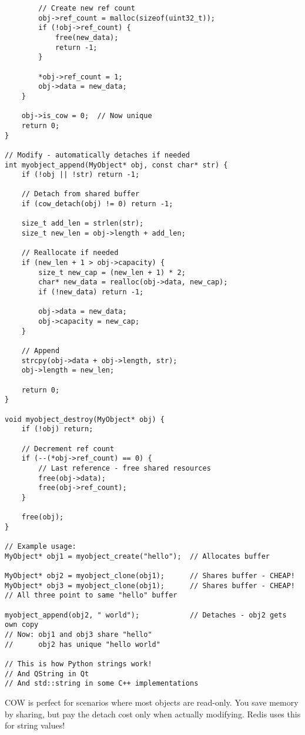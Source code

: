 \begin{lstlisting}
        // Create new ref count
        obj->ref_count = malloc(sizeof(uint32_t));
        if (!obj->ref_count) {
            free(new_data);
            return -1;
        }

        *obj->ref_count = 1;
        obj->data = new_data;
    }

    obj->is_cow = 0;  // Now unique
    return 0;
}

// Modify - automatically detaches if needed
int myobject_append(MyObject* obj, const char* str) {
    if (!obj || !str) return -1;

    // Detach from shared buffer
    if (cow_detach(obj) != 0) return -1;

    size_t add_len = strlen(str);
    size_t new_len = obj->length + add_len;

    // Reallocate if needed
    if (new_len + 1 > obj->capacity) {
        size_t new_cap = (new_len + 1) * 2;
        char* new_data = realloc(obj->data, new_cap);
        if (!new_data) return -1;

        obj->data = new_data;
        obj->capacity = new_cap;
    }

    // Append
    strcpy(obj->data + obj->length, str);
    obj->length = new_len;

    return 0;
}

void myobject_destroy(MyObject* obj) {
    if (!obj) return;

    // Decrement ref count
    if (--(*obj->ref_count) == 0) {
        // Last reference - free shared resources
        free(obj->data);
        free(obj->ref_count);
    }

    free(obj);
}

// Example usage:
MyObject* obj1 = myobject_create("hello");  // Allocates buffer

MyObject* obj2 = myobject_clone(obj1);      // Shares buffer - CHEAP!
MyObject* obj3 = myobject_clone(obj1);      // Shares buffer - CHEAP!
// All three point to same "hello" buffer

myobject_append(obj2, " world");            // Detaches - obj2 gets own copy
// Now: obj1 and obj3 share "hello"
//      obj2 has unique "hello world"

// This is how Python strings work!
// And QString in Qt
// And std::string in some C++ implementations
\end{lstlisting}

\begin{tipbox}
COW is perfect for scenarios where most objects are read-only. You save memory by sharing, but pay the detach cost only when actually modifying. Redis uses this for string values!
\end{tipbox}

